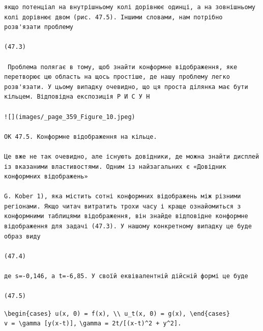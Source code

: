 \documentclass[
  ukrainian,
]{article}
\begin{document}
\begin{verbatim}
якщо потенціал на внутрішньому колі дорівнює одинці, а на зовнішньому колі дорівнює двом (рис. 47.5). Іншими словами, нам потрібно розв'язати проблему

(47.3)

 Проблема полягає в тому, щоб знайти конформне відображення, яке перетворює цю область на щось простіше, де нашу проблему легко розв'язати. У цьому випадку очевидно, що ця проста ділянка має бути кільцем. Відповідна експозиція Р И С У Н

![](images/_page_359_Figure_10.jpeg)

ОК 47.5. Конформне відображення на кільце.

Це вже не так очевидно, але існують довідники, де можна знайти дисплей із вказаними властивостями. Одним із найзагальних є «Довідник конформних відображень»

G. Kober 1), яка містить сотні конформних відображень між різними регіонами. Якщо читач витратить трохи часу і краще ознайомиться з конформними таблицями відображення, він знайде відповідне конформне відображення для задачі (47.3). У нашому конкретному випадку це буде образ виду

(47.4)

де s=-0,146, а t=-6,85. У своїй еквівалентній дійсній формі це буде

(47.5)
\end{verbatim}

\texttt{\textbackslash{}begin\{cases\}\ u(x,\ 0)\ =\ f(x),\ \textbackslash{}\textbackslash{}\ u\_t(x,\ 0)\ =\ g(x),\ \textbackslash{}end\{cases\}}
\texttt{v\ =\ \textbackslash{}gamma\ {[}y(x-t){]},}
\texttt{\textbackslash{}gamma\ =\ 2t/{[}(x-t)\^{}2\ +\ y\^{}2{]}.}
\end{document}
